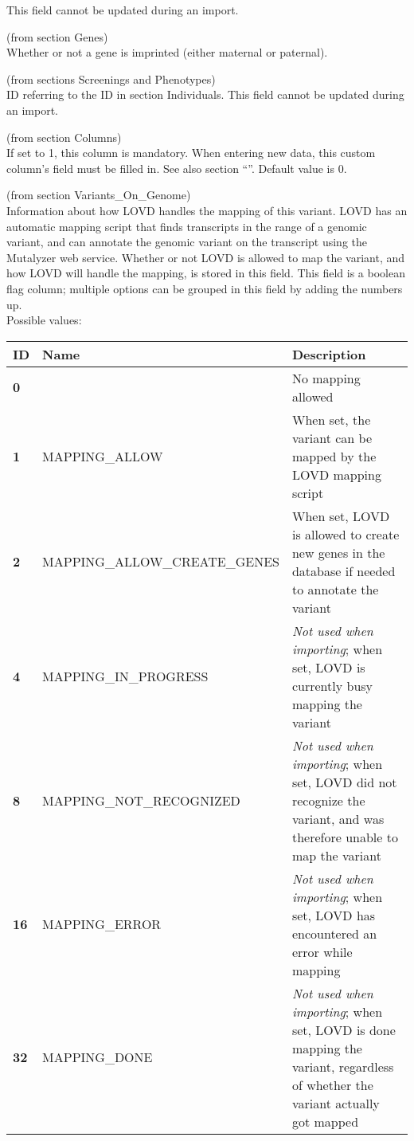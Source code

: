 \begin{description}
  This field cannot be updated during an import.
  \item[imprinting] (from section Genes)\hfill \\
  Whether or not a gene is imprinted (either maternal or paternal).
  \item[individualid] (from sections Screenings and Phenotypes) \hfill \\
  ID referring to the ID in section Individuals.
  This field cannot be updated during an import.
  \item[mandatory] (from section Columns)\hfill \\
  If set to 1, this column is mandatory.
  When entering new data, this custom column's field must be filled in.
  See also section ``''.
  Default value is 0.
  \item[mapping\_flags] (from section Variants\_On\_Genome)\hfill \\
  Information about how LOVD handles the mapping of this variant.
  LOVD has an automatic mapping script that finds transcripts in the range of a genomic variant, and can annotate the
    genomic variant on the transcript using the Mutalyzer web service.
  Whether or not LOVD is allowed to map the variant, and how LOVD will handle the mapping, is stored in this field.
  This field is a boolean flag column; multiple options can be grouped in this field by adding the numbers up.\\
  Possible values:\\
  \begin{tabular}{>{\bfseries}p{0.6cm} p{7.7cm} p{6.3cm}}
    ID & \textbf{Name} & \textbf{Description}\\ \hline \hline
    0 & & No mapping allowed\\ \hline
    1 & MAPPING\_ALLOW & When set, the variant can be map\-ped by the LOVD mapping script\\ \hline
    2 & MAPPING\_ALLOW\_CREATE\_GENES & When set, LOVD is allowed to create new genes in the database if needed to
      annotate the variant\\ \hline
    4 & MAPPING\_IN\_PROGRESS & \emph{Not used when importing}; when set, LOVD is currently busy mapping the
      variant\\ \hline
    8 & MAPPING\_NOT\_RECOGNIZED & \emph{Not used when importing}; when set, LOVD did not recognize the variant, and
      was therefore unable to map the variant\\ \hline
    16 & MAPPING\_ERROR & \emph{Not used when importing}; when set, LOVD has encountered an error while mapping\\ \hline
    32 & MAPPING\_DONE & \emph{Not used when importing}; when set, LOVD is done mapping the variant, regardless of
      whether the variant actually got mapped\\ \hline
  \end{tabular}


\end{description}
